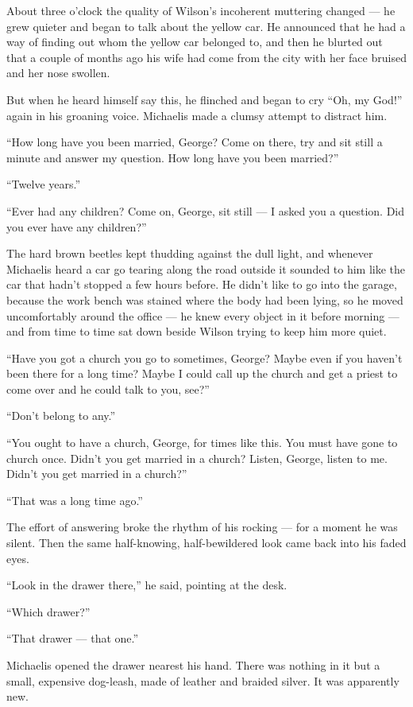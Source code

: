 \documentclass{znotebook}
\begin{document}
About three o'clock the quality of Wilson's incoherent muttering changed — he grew quieter and began to talk about the yellow car. He announced that he had a way of finding out whom the yellow car belonged to, and then he blurted out that a couple of months ago his wife had come from the city with her face bruised and her nose swollen.

But when he heard himself say this, he flinched and began to cry ``Oh, my God!'' again in his groaning voice. Michaelis made a clumsy attempt to distract him.

``How long have you been married, George? Come on there, try and sit still a minute and answer my question. How long have you been married?''

``Twelve years.''

``Ever had any children? Come on, George, sit still — I asked you a question. Did you ever have any children?''

The hard brown beetles kept thudding against the dull light, and whenever Michaelis heard a car go tearing along the road outside it sounded to him like the car that hadn't stopped a few hours before. He didn't like to go into the garage, because the work bench was stained where the body had been lying, so he moved uncomfortably around the office — he knew every object in it before morning — and from time to time sat down beside Wilson trying to keep him more quiet.

``Have you got a church you go to sometimes, George? Maybe even if you haven't been there for a long time? Maybe I could call up the church and get a priest to come over and he could talk to you, see?''

``Don't belong to any.''

``You ought to have a church, George, for times like this. You must have gone to church once. Didn't you get married in a church? Listen, George, listen to me. Didn't you get married in a church?''

``That was a long time ago.''

The effort of answering broke the rhythm of his rocking — for a moment he was silent. Then the same half-knowing, half-bewildered look came back into his faded eyes.

``Look in the drawer there,'' he said, pointing at the desk.

``Which drawer?''

``That drawer — that one.''

Michaelis opened the drawer nearest his hand. There was nothing in it but a small, expensive dog-leash, made of leather and braided silver. It was apparently new.
\end{document}

